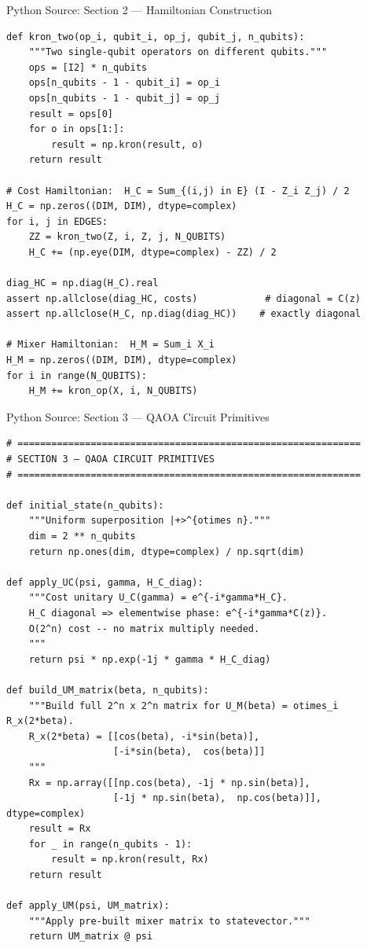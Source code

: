\documentclass{beamer}
\begin{document}
\begin{frame}
\begin{frame}{Python Source: Section 2 — Hamiltonian Construction}
\begin{verbatim}
def kron_two(op_i, qubit_i, op_j, qubit_j, n_qubits):
    """Two single-qubit operators on different qubits."""
    ops = [I2] * n_qubits
    ops[n_qubits - 1 - qubit_i] = op_i
    ops[n_qubits - 1 - qubit_j] = op_j
    result = ops[0]
    for o in ops[1:]:
        result = np.kron(result, o)
    return result

# Cost Hamiltonian:  H_C = Sum_{(i,j) in E} (I - Z_i Z_j) / 2
H_C = np.zeros((DIM, DIM), dtype=complex)
for i, j in EDGES:
    ZZ = kron_two(Z, i, Z, j, N_QUBITS)
    H_C += (np.eye(DIM, dtype=complex) - ZZ) / 2

diag_HC = np.diag(H_C).real
assert np.allclose(diag_HC, costs)            # diagonal = C(z)
assert np.allclose(H_C, np.diag(diag_HC))    # exactly diagonal

# Mixer Hamiltonian:  H_M = Sum_i X_i
H_M = np.zeros((DIM, DIM), dtype=complex)
for i in range(N_QUBITS):
    H_M += kron_op(X, i, N_QUBITS)
\end{verbatim}
\end{frame}


\begin{frame}{Python Source: Section 3 — QAOA Circuit Primitives}
\footnotesize
\begin{verbatim}
# =============================================================
# SECTION 3 — QAOA CIRCUIT PRIMITIVES
# =============================================================

def initial_state(n_qubits):
    """Uniform superposition |+>^{otimes n}."""
    dim = 2 ** n_qubits
    return np.ones(dim, dtype=complex) / np.sqrt(dim)

def apply_UC(psi, gamma, H_C_diag):
    """Cost unitary U_C(gamma) = e^{-i*gamma*H_C}.
    H_C diagonal => elementwise phase: e^{-i*gamma*C(z)}.
    O(2^n) cost -- no matrix multiply needed.
    """
    return psi * np.exp(-1j * gamma * H_C_diag)

def build_UM_matrix(beta, n_qubits):
    """Build full 2^n x 2^n matrix for U_M(beta) = otimes_i R_x(2*beta).
    R_x(2*beta) = [[cos(beta), -i*sin(beta)],
                   [-i*sin(beta),  cos(beta)]]
    """
    Rx = np.array([[np.cos(beta), -1j * np.sin(beta)],
                   [-1j * np.sin(beta),  np.cos(beta)]], dtype=complex)
    result = Rx
    for _ in range(n_qubits - 1):
        result = np.kron(result, Rx)
    return result

def apply_UM(psi, UM_matrix):
    """Apply pre-built mixer matrix to statevector."""
    return UM_matrix @ psi


\end{verbatim}
\end{frame}
\end{frame}
\end{document}

